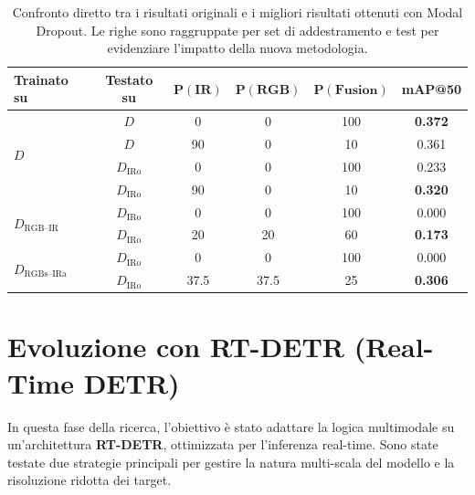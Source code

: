 \documentclass[a4paper,11pt]{article}
\begin{document}
\begin{table}[h]
\centering

\caption{Confronto diretto tra i risultati originali e i migliori risultati ottenuti con Modal Dropout. Le righe sono raggruppate per set di addestramento e test per evidenziare l'impatto della nuova metodologia.}
\label{tab:summary_comparison}
\begin{tabular}{l c c c c c}
\toprule
\textbf{Trainato su} & \textbf{Testato su} & $\boldsymbol{P(\text{IR})}$ & $\boldsymbol{P(\text{RGB})}$ & $\boldsymbol{P(\text{Fusion})}$ & \textbf{mAP@50} \\
\midrule

\multirow{4}{*}{$D$} 
 & $D$ & 0 & 0 & 100 & \textbf{0.372} \\
 & $D$ & 90 & 0 & 10 & 0.361 \\
 \cmidrule(l){2-6} 
 & $D_{\text{IRo}}$ & 0 & 0 & 100 & 0.233 \\
 & $D_{\text{IRo}}$ & 90 & 0 & 10 & \textbf{0.320} \\
\midrule

\multirow{2}{*}{$D_{\text{RGB--IR}}$} 
 & $D_{\text{IRo}}$ & 0 & 0 & 100 & 0.000 \\
 & $D_{\text{IRo}}$ & 20 & 20 & 60 & \textbf{0.173} \\
\midrule

\multirow{2}{*}{$D_{\text{RGBs--IRa}}$} 
 & $D_{\text{IRo}}$ & 0 & 0 & 100 & 0.000 \\
 & $D_{\text{IRo}}$ & 37.5 & 37.5 & 25 & \textbf{0.306} \\

\bottomrule
\end{tabular}
\end{table}


\newpage
\section{Evoluzione con RT-DETR (Real-Time DETR)}

In questa fase della ricerca, l'obiettivo è stato adattare la logica multimodale su un'architettura \textbf{RT-DETR}, ottimizzata per l'inferenza real-time. Sono state testate due strategie principali per gestire la natura multi-scala del modello e la risoluzione ridotta dei target.
\end{document}
